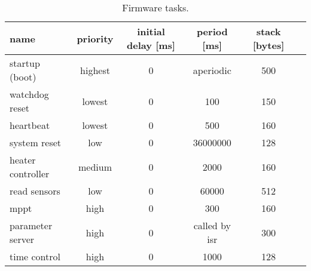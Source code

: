 \begin{table}[!h]
    \centering
    \begin{tabular}{lccccc}
        \toprule[1.5pt]
        \textbf{name}          & \textbf{priority} & \textbf{initial delay [ms]} & \textbf{period [ms]} & \textbf{stack [bytes]} \\
        \midrule
        startup (boot)         & highest           & 0                           & aperiodic            & 500                    \\
        watchdog reset         & lowest            & 0                           & 100                  & 150                    \\
        heartbeat              & lowest            & 0                           & 500                  & 160                    \\
        system reset           & low               & 0                           & 36000000             & 128                    \\
        heater controller      & medium            & 0                           & 2000                  & 160                    \\
        read sensors           & low               & 0                           & 60000                & 512                    \\
        mppt                   & high              & 0                           & 300                  & 160                    \\
        parameter server       & high              & 0      & called by isr\nomenclature{\textbf{isr}}{\textit{interrupt service routine.}}   & 300 \\
        time control           & high              & 0                           & 1000                 & 128                    \\
        \bottomrule[1.5pt]
    \end{tabular}
    \caption{Firmware tasks.}
    \label{tab:firmware-tasks}
\end{table}

